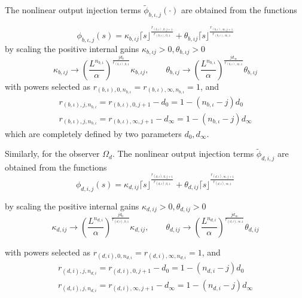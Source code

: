 \documentclass[11pt,letterpaper,twoside,openright]{report}
\newcommand{\sig}[2]{\lceil#1\rfloor^{#2}}
\begin{document}
\newpage
The nonlinear output injection terms $\tilde{\phi}_{b,\iota,j}(\cdot)$ are obtained from the functions

\begin{equation}\label{ecu: CH4 Injection Sigma_b}
	\phi_{b,\iota,j}(s) = \kappa_{b,\iota j} \sig{s}{\frac{r_{(b,\iota),0,j+1}}{r_{(b,\iota),0,1}}} + \theta_{b,\iota j} \sig{s}{\frac{r_{(b,\iota),\infty,j+1}}{r_{(b,\iota),\infty,1}}}
\end{equation}
by scaling the positive internal gains $\kappa_{b,\iota j}>0,\theta_{b,\iota j}>0$
\begin{equation}
	\kappa_{b,\iota j} \rightarrow \left( \frac{L^{n_{b,\iota}}}{\alpha}\right)^{\frac{jd_0}{r_{(b,\iota),0,1}}}\kappa_{b,\iota j} ,\qquad \theta_{b,\iota j} \rightarrow \left( \frac{L^{n_{b,\iota}}}{\alpha}\right)^{\frac{jd_{\infty}}{r_{(b,\iota),\infty,1}}}\theta_{b,\iota j}
\end{equation}
with powers selected as $r_{(b,\iota),0,n_{b,\iota}}=r_{(b,\iota),\infty,n_{b,\iota}}=1$, and
\begin{equation}\label{ecu: r-siso}
	\begin{split}
		r_{(b,\iota),j,n_{b,\iota}} = r_{(b,\iota),0,j+1}-d_0 = 1-(n_{b,\iota}-j)d_0 \\
		r_{(b,\iota),j,n_{b,\iota}} = r_{(b,\iota),\infty,j+1}-d_{\infty} = 1-(n_{b,\iota}-j)d_{\infty}
	\end{split}
\end{equation}
which are completely defined by two parameters $d_0,d_{\infty}$.

Similarly, for the observer $\Omega_d$. The nonlinear output injection terms $\tilde{\phi}_{d,i,j}$ are obtained from the functions 
\begin{equation}\label{ecu: CH4 Injection Sigma_d}
	\phi_{d,i,j}(s) = \kappa_{d,i j} \lceil s \rfloor^{\frac{r_{(d,i),0,j+1}}{r_{(d,i),0,1}}} + \theta_{d,i j} \lceil s \rfloor^{\frac{r_{(d,i),\infty,j+1}}{r_{(d,i),\infty,1}}}
\end{equation}

by scaling the positive internal gains $\kappa_{d,i j}>0,\theta_{d,i j}>0$
\begin{equation}
	\kappa_{d,i j} \rightarrow \left( \frac{L^{n_{d,i}}}{\alpha}\right)^{\frac{jd_0}{r_{(d,i),0,1}}}\kappa_{d,i j} ,\qquad \theta_{d,i j} \rightarrow \left( \frac{L^{n_{d,i}}}{\alpha}\right)^{\frac{jd_{\infty}}{r_{(d,i),\infty,1}}}\theta_{d,i j}
\end{equation}

with powers selected as $r_{(d,i ),0,n_{d,i}}=r_{(d,i),\infty,n_{d,i}}=1$, and
\begin{equation}
	\begin{split}
		r_{(d,i),j,n_{d,i}} = r_{(d,i),0,j+1}-d_0 = 1-(n_{d,i}-j)d_0 \\
		r_{(d,i),j,n_{d,i}} = r_{(d,i),\infty,j+1}-d_{\infty} = 1-(n_{d,i}-j)d_{\infty}
	\end{split}
\end{equation}
\end{document}
